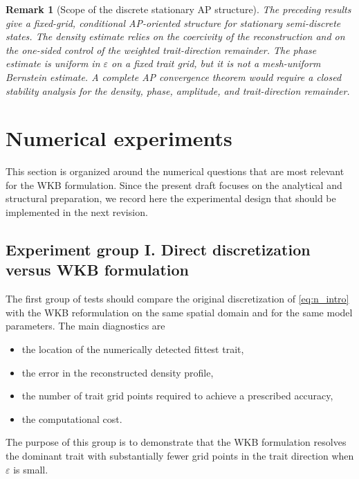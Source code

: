 \documentclass[11pt, dina4, amsfont12]{article}
\newtheorem{remark}{Remark}[section]
\begin{document}
\begin{remark}[Scope of the discrete stationary AP structure]
The preceding results give a fixed-grid, conditional AP-oriented structure
for stationary semi-discrete states. The density estimate relies on the
coercivity of the reconstruction and on the one-sided control of the
weighted trait-direction remainder. The phase estimate is uniform in
\(\varepsilon\) on a fixed trait grid, but it is not a mesh-uniform Bernstein
estimate. A complete AP convergence theorem would require a closed stability
analysis for the density, phase, amplitude, and trait-direction remainder.
\end{remark}



\section{Numerical experiments}

This section is organized around the numerical questions that are most relevant for the WKB formulation. Since the present draft focuses on the analytical and structural preparation, we record here the experimental design that should be implemented in the next revision.

\subsection{Experiment group I. Direct discretization versus WKB formulation}

The first group of tests should compare the original discretization of \eqref{eq:n_intro} with the WKB reformulation on the same spatial domain and for the same model parameters. The main diagnostics are
\begin{itemize}
\item the location of the numerically detected fittest trait,
\item the error in the reconstructed density profile,
\item the number of trait grid points required to achieve a prescribed accuracy,
\item the computational cost.
\end{itemize}
The purpose of this group is to demonstrate that the WKB formulation resolves the dominant trait with substantially fewer grid points in the trait direction when $\varepsilon$ is small.
\end{document}
